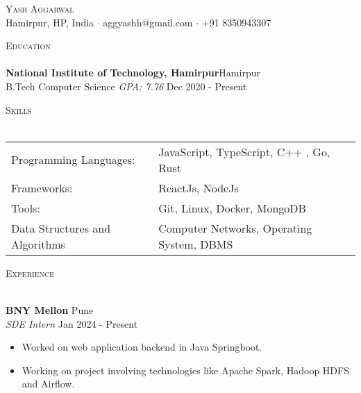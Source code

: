 \documentclass[a4paper]{article}
\newcommand{\lineunder} {
    \vspace*{-8pt} \\
    \hspace*{-18pt} \hrulefill \\
}
\newcommand{\header} [1] {
    {\hspace*{-18pt}\vspace*{6pt} \textsc{#1}}
    \vspace*{-6pt} \lineunder
}
\begin{document}
\vspace*{-40pt}



\vspace*{-10pt}
\begin{center}
	{\Huge \scshape {Yash Aggarwal}}\\
	Hamirpur, HP, India $\cdot$ aggyashh@gmail.com $\cdot$ +91 8350943307\\
\end{center}

\header{Education}
\textbf{National Institute of Technology, Hamirpur}\hfill Hamirpur\\
B.Tech Computer Science \textit{GPA: 7.76} \hfill Dec 2020 - Present\\
\vspace{2mm}

\header{Skills}
\begin{tabular}{ l l }
	Programming Languages:          & JavaScript, TypeScript, C++ , Go, Rust        \\
	Frameworks:                     &  ReactJs, NodeJs          \\
	Tools:                          & Git, Linux, Docker, MongoDB  \\
	Data Structures and Algorithms  & Computer Networks, Operating System, DBMS                                           \\
\end{tabular}
\vspace{2mm}

\header{Experience}
\vspace{1mm}

\textbf{BNY Mellon} \hfill Pune\\
\textit{SDE Intern} \hfill Jan 2024 - Present\\
\vspace{-1mm}
\begin{itemize} \itemsep 1pt
\item Worked on web application backend in Java Springboot.
\item Working on project involving technologies like Apache Spark, Hadoop HDFS and Airflow.
\end{itemize}
\end{document}
